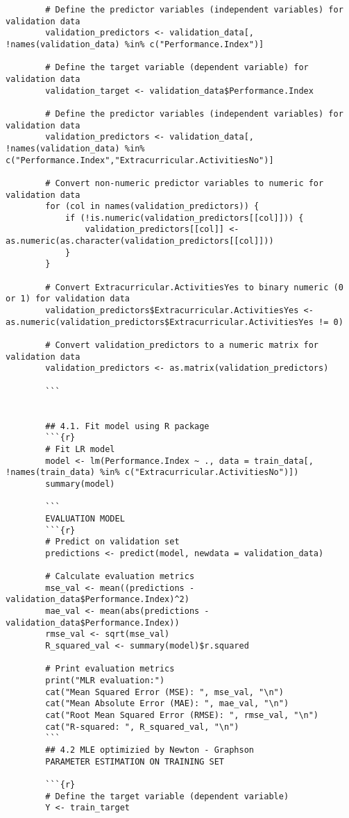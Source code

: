 \documentclass[12pt]{article}
\begin{document}
\begin{lstlisting}
		# Define the predictor variables (independent variables) for validation data
		validation_predictors <- validation_data[, !names(validation_data) %in% c("Performance.Index")]
		
		# Define the target variable (dependent variable) for validation data
		validation_target <- validation_data$Performance.Index
		
		# Define the predictor variables (independent variables) for validation data
		validation_predictors <- validation_data[, !names(validation_data) %in% c("Performance.Index","Extracurricular.ActivitiesNo")]
		
		# Convert non-numeric predictor variables to numeric for validation data
		for (col in names(validation_predictors)) {
			if (!is.numeric(validation_predictors[[col]])) {
				validation_predictors[[col]] <- as.numeric(as.character(validation_predictors[[col]]))
			}
		}
		
		# Convert Extracurricular.ActivitiesYes to binary numeric (0 or 1) for validation data
		validation_predictors$Extracurricular.ActivitiesYes <- as.numeric(validation_predictors$Extracurricular.ActivitiesYes != 0)
		
		# Convert validation_predictors to a numeric matrix for validation data
		validation_predictors <- as.matrix(validation_predictors)
		
		```
		
		
		## 4.1. Fit model using R package
		```{r}
		# Fit LR model 
		model <- lm(Performance.Index ~ ., data = train_data[, !names(train_data) %in% c("Extracurricular.ActivitiesNo")])
		summary(model)
		
		```
		EVALUATION MODEL 
		```{r}
		# Predict on validation set
		predictions <- predict(model, newdata = validation_data)
		
		# Calculate evaluation metrics
		mse_val <- mean((predictions - validation_data$Performance.Index)^2)
		mae_val <- mean(abs(predictions - validation_data$Performance.Index))
		rmse_val <- sqrt(mse_val)
		R_squared_val <- summary(model)$r.squared
		
		# Print evaluation metrics
		print("MLR evaluation:")
		cat("Mean Squared Error (MSE): ", mse_val, "\n")
		cat("Mean Absolute Error (MAE): ", mae_val, "\n")
		cat("Root Mean Squared Error (RMSE): ", rmse_val, "\n")
		cat("R-squared: ", R_squared_val, "\n")
		```
		## 4.2 MLE optimizied by Newton - Graphson 
		PARAMETER ESTIMATION ON TRAINING SET
		
		```{r}
		# Define the target variable (dependent variable)
		Y <- train_target
		

\end{lstlisting}
\end{document}
